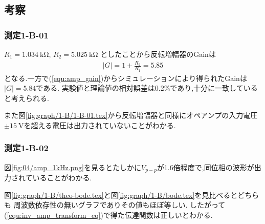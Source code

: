 \subsection{考察}
\subsubsection{測定1-B-01}
$R_1=1.034\ \si{\kilo\ohm}$, $R_2=5.025\ \si{\kilo\ohm}$
としたことから反転増幅器のGainは
\begin{align}
  |G|=1+\frac{R_2}{R_1}=5.85
\end{align}
となる.一方で(\ref{equ:amp_gain})からシミュレーションにより得られたGainは$|G|=5.84$である.
実験値と理論値の相対誤差は$0.2\%$であり,十分に一致していると考えられる.

また図\ref{fig:graph/1-B/1-B-01.tex}から反転増幅器と同様にオペアンプの入力電圧$\pm15\ \si{\volt}$を超える電圧は出力されていないことがわかる.
\subsubsection{測定1-B-02}
図\ref{fig:04/amp_1kHz.png}を見るとたしかに$V_{p-p}$が1.6倍程度で,同位相の波形が出力されていることがわかる.

図\ref{fig:graph/1-B/theo-bode.tex}と図\ref{fig:graph/1-B/bode.tex}を見比べるとどちらも
周波数依存性の無いグラフでありその値もほぼ等しい.
したがって(\ref{equ:inv_amp_transform_eq})で得た伝達関数は正しいとわかる.